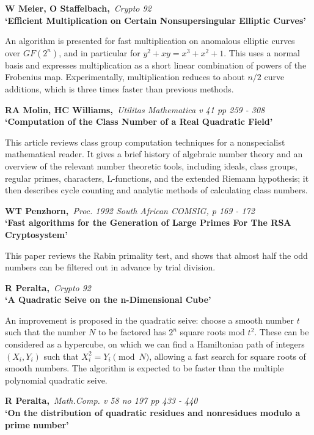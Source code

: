 \pagebreak

{\bf \noindent W Meier, O Staffelbach,}{\em ~Crypto 92\\}
{\bf `Efficient Multiplication on Certain Nonsupersingular Elliptic Curves'}

An algorithm is presented for fast multiplication on anomalous elliptic
curves over $GF(2^n)$, and in particular for $y^2 + xy = x^3 + x^2 + 1$.
This uses a normal basis and expresses multiplication as a short linear
combination of powers of the Frobenius map. Experimentally, multiplication
reduces to about $n/2$ curve additions, which is three times faster 
than previous methods.

{\bf \noindent RA Molin, HC Williams,}{\em ~Utilitas Mathematica v 41 pp
259 - 308\\}
{\bf `Computation of the Class Number of a Real Quadratic Field'}

This article reviews class group computation techniques for a nonspecialist
mathematical reader. It gives a brief history of algebraic number theory 
and an overview of the relevant number theoretic tools, including ideals,
class groups, regular primes, characters, L-functions, and the extended 
Riemann hypothesis; it then describes cycle counting and analytic methods
of calculating class numbers.

{\bf \noindent WT Penzhorn,}{\em ~Proc. 1992 South African COMSIG, p 169 - 
172\\}
{\bf `Fast algorithms for the Generation of Large Primes For The RSA 
Cryptosystem'}

This paper reviews the Rabin primality test, and shows that almost half the 
odd numbers can be filtered out in advance by trial division.

{\bf \noindent R Peralta,}{\em ~Crypto 92\\}
{\bf `A Quadratic Seive on the n-Dimensional Cube'}

An improvement is proposed in the quadratic seive: choose a smooth number $t$
such that the number $N$ to be factored has $2^n$ square roots mod $t^2$.
These can be considered as a hypercube, on which we can find a Hamiltonian
path of integers $(X_i, Y_i)$ such that $X_i^2 = Y_i \pmod{N}$, allowing a 
fast search for square roots of smooth numbers. The algorithm is expected to 
be faster than the multiple polynomial quadratic seive.

{\bf \noindent R Peralta,}{\em ~Math.Comp. v 58 no 197 pp 433 - 440\\}
{\bf `On the distribution of quadratic residues and nonresidues modulo a
prime number'}

